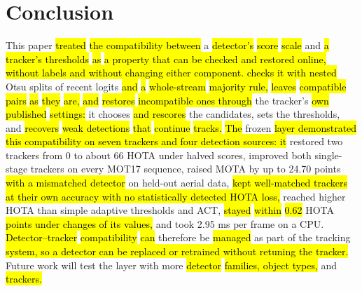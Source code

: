 \section{Conclusion}\label{sec:conclusion}

This paper \hl{treated} \hl{the compatibility between} a \hl{detector's} \hl{score} \hl{scale} and \hl{a} \hl{tracker's thresholds}
\hl{as} \hl{a property that can be checked and restored online, without labels and without changing either
component. \scl{} checks it with nested} Otsu splits of recent logits \hl{and} \hl{a} \hl{whole-stream} \hl{majority
rule,} \hl{leaves} \hl{compatible} \hl{pairs} \hl{as} \hl{they} \hl{are,} \hl{and} \hl{restores} \hl{incompatible ones through} the tracker's \hl{own
published} \hl{settings:} it chooses \hl{and rescores} the candidates, sets the thresholds, and \hl{recovers} \hl{weak
detections} \hl{that} \hl{continue} \hl{tracks.} \hl{The} frozen \hl{layer demonstrated this compatibility on seven trackers
and four detection sources: it} restored two trackers from 0 to about 66 HOTA under halved scores,
improved both single-stage trackers on every MOT17 sequence, raised MOTA by up to 24.70 points \hl{with
a mismatched detector} on held-out aerial data, \hl{kept well-matched trackers at their own accuracy
with no statistically detected HOTA loss,} reached higher HOTA than simple adaptive thresholds and
ACT, \hl{stayed} \hl{within} \hl{0.62} HOTA \hl{points under changes of its values,} and took 2.95 ms per frame on a
CPU. \hl{Detector--tracker} \hl{compatibility} \hl{can} therefore be \hl{managed} as part of the tracking \hl{system, so a
detector can be replaced or retrained without retuning the tracker.} Future work will test the layer
with more \hl{detector} \hl{families, object types,} and \hl{trackers.}
